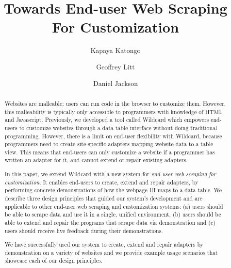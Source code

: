 \documentclass[sigconf,10pt]{acmart}
\begin{document}
\title{Towards End-user Web Scraping For Customization}


\author{Kapaya Katongo}

\author{Geoffrey Litt}

\author{Daniel Jackson}


\begin{abstract}
  Websites are malleable: users can run code in the browser to customize
  them. However, this malleability is typically only accessible to
  programmers with knowledge of HTML and Javascript. Previously, we
  developed a tool called Wildcard which empowers end-users to customize
  websites through a data table interface without doing traditional
  programming. However, there is a limit on end-user flexibility with
  Wildcard, because programmers need to create site-specific adapters
  mapping website data to a table view. This means that end-users can
  only customize a website if a programmer has written an adapter for
  it, and cannot extend or repair existing adapters.

  In this paper, we extend Wildcard with a new system for \emph{end-user
  web scraping for customization}. It enables end-users to create,
  extend and repair adapters, by performing concrete demonstrations of
  how the webpage UI maps to a data table. We describe three design
  principles that guided our system's development and are applicable to
  other end-user web scraping and customization systems: (a) users
  should be able to scrape data and use it in a single, unified
  environment, (b) users should be able to extend and repair the
  programs that scrape data via demonstration and (c) users should
  receive live feedback during their demonstrations.

  We have successfully used our system to create, extend and repair
  adapters by demonstration on a variety of websites and we provide
  example usage scenarios that showcase each of our design principles.
\end{abstract}
\end{document}
